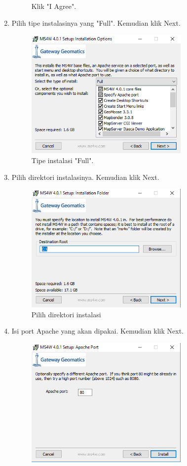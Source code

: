 \begin{enumerate}
\begin{figure}[H]
		\centering
		\caption{Klik "I Agree".}
	\end{figure}
	\item  Pilih tipe instalasinya yang "Full". Kemudian klik Next.
	\hfill\break
	\begin{figure}[H]
		\includegraphics[width=8cm]{figures/Tugas4/1174077/4.png}
		\centering
		\caption{Tipe instalasi "Full".}
	\end{figure}
	\item  Pilih direktori instalasinya. Kemudian klik Next.
	\hfill\break
	\begin{figure}[H]
		\includegraphics[width=8cm]{figures/Tugas4/1174077/5.png}
		\centering
		\caption{Pilih direktori instalasi}
	\end{figure}
	\item  Isi port Apache yang akan dipakai. Kemudian klik Next.
	\hfill\break
	\begin{figure}[H]
		\includegraphics[width=8cm]{figures/Tugas4/1174077/6.png}

\end{figure}
\end{enumerate}
